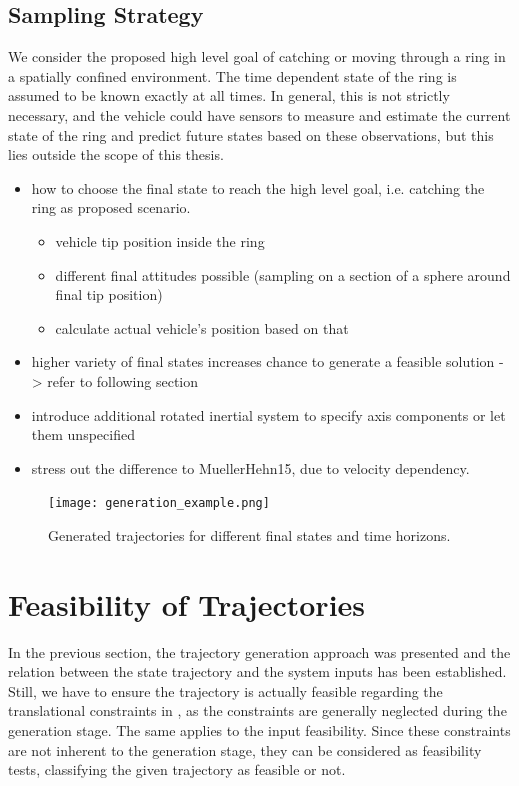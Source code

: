 \subsection{Sampling Strategy}
We consider the proposed high level goal of catching or moving through a ring in a spatially confined environment. The time dependent state of the ring is assumed to be known exactly at all times. In general, this is not strictly necessary, and the vehicle could have sensors to measure and estimate the current state of the ring and predict future states based on these observations, but this lies outside the scope of this thesis.


\begin{itemize}
	\color{red}
	\item how to choose the final state to reach the high level goal, i.e. catching the ring as proposed scenario.
	\begin{itemize}
		\item vehicle tip position inside the ring
		\item different final attitudes possible (sampling on a section of a sphere around final tip position)
		\item calculate actual vehicle's position based on that
	\end{itemize}
	\item higher variety of final states increases chance to generate a feasible solution -> refer to following section
	\item introduce additional rotated inertial system to specify axis components or let them unspecified
	\item stress out the difference to MuellerHehn15, due to velocity dependency.
\end{itemize}
\begin{figure}[h!]
	\centering
	\texttt{[image: generation\_example.png]}
	\caption{Generated trajectories for different final states and time horizons.}
\end{figure}
\section{Feasibility of Trajectories}
\label{sec:feasibility}
In the previous section, the trajectory generation approach was presented and the relation between the state trajectory and the system inputs has been established.
Still, we have to ensure the trajectory is actually feasible regarding the translational constraints in , as the constraints are generally neglected during the generation stage.
The same applies to the input feasibility.
Since these constraints are not inherent to the generation stage, they can be considered as feasibility tests, classifying the given trajectory as feasible or not. 


